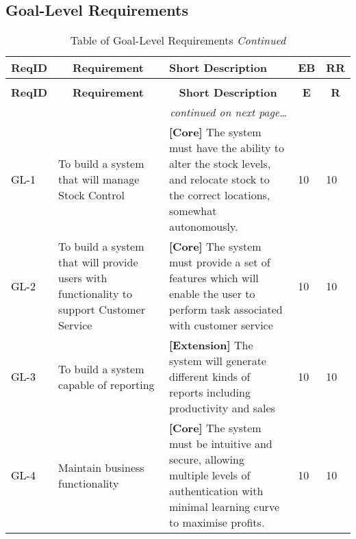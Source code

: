 \documentclass[a4paper]{article}
\begin{document}
\subsection{Goal-Level Requirements}


\begin{longtable}{|l|p{5cm}|p{7cm}|p{0.5cm}|p{0.5cm}|}
  \caption{Table of Goal-Level Requirements}\\
  \hline
  \multicolumn{1}{|c|}{\textbf{ReqID}}  &
  \multicolumn{1}{|c|}{\textbf{Requirement}} &
  \textbf{Short Description}&
  \textbf{EB} & 
  \textbf{RR}\\
  \hline\hline
  \endfirsthead
  \caption[]{Table of Goal-Level Requirements \textit{Continued}}\\
  \hline
  \multicolumn{1}{|c|}{\textbf{ReqID}} &
  \multicolumn{1}{|c|}{\textbf{Requirement}} &
  \multicolumn{1}{|c|}{\textbf{Short Description}} & 
  \multicolumn{1}{|c|}{\textbf{E}} & 
  \multicolumn{1}{|c|}{\textbf{R}}\\
  \hline\hline
  \endhead
  \hline
  \multicolumn{3}{r}{\textit{continued on next page\ldots}}\\
  \endfoot
  \hline
  \endlastfoot
  \textcolor{black}{GL-1}  &  To build a system that will manage Stock Control     & \textbf{[Core] }The system must have the ability to alter the stock levels, and relocate stock to the correct locations, somewhat autonomously. & 10 & 10 \\
  \hline
 \textcolor{black}{ GL-2}  &  To build a system that will provide users with functionality to support Customer Service & \textbf{[Core] }The system must provide a set of features which will enable the user to perform task associated with customer service & 10 & 10\\
  \hline
  \textcolor{black}{GL-3}  &  To build a system capable of reporting & \textbf{[Extension] }The system will generate different kinds of reports including productivity and sales & 10 & 10 \\
  \hline
  \textcolor{black}{GL-4}  &  Maintain business functionality &  \textbf{[Core] }The system must be intuitive and secure, allowing multiple levels of authentication with minimal learning curve to maximise profits.& 10 & 10 \\
  \hline
\end{longtable}

\pagebreak
\end{document}
